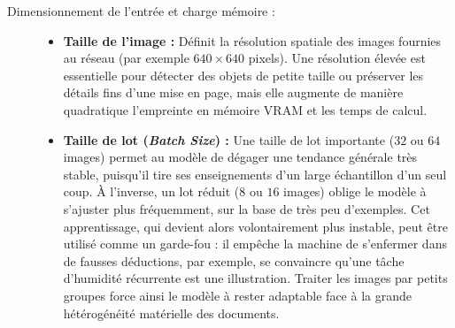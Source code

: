 \begin{description}
	\item[Dimensionnement de l'entrée et charge mémoire :]\hfill
	\begin{itemize}
		\item \textbf{Taille de l'image :} Définit la résolution spatiale des images fournies au réseau (par exemple $640 \times 640$ pixels). Une résolution élevée est essentielle pour détecter des objets de petite taille ou préserver les détails fins d'une mise en page, mais elle augmente de manière quadratique l'empreinte en mémoire VRAM et les temps de calcul.
		\item \textbf{Taille de lot (\textit{Batch Size}) :} Une taille de lot importante ($32$ ou $64$ images) permet au modèle de dégager une tendance générale très stable, puisqu'il tire ses enseignements d'un large échantillon d'un seul coup. À l'inverse, un lot réduit ($8$ ou $16$ images) oblige le modèle à s'ajuster plus fréquemment, sur la base de très peu d'exemples. Cet apprentissage, qui devient alors volontairement plus instable, peut être utilisé comme un garde-fou : il empêche la machine de s'enfermer dans de fausses déductions, par exemple, se convaincre qu'une tâche d'humidité récurrente est une illustration. Traiter les images par petits groupes force ainsi le modèle à rester adaptable face à la grande hétérogénéité matérielle des documents.
	\end{itemize}
	

\end{description}
